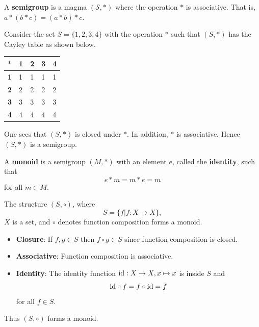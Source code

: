 \begin{definition}
    A \textbf{semigroup} is a magma $(\mathcal{S}, \ast)$ where the operation $\ast$ is associative. That is, $a\ast(b\ast c) = (a\ast b)\ast c$.
\end{definition}
\begin{example}
    Consider the set $S = \{1, 2, 3, 4\}$ with the operation $\ast$ such that $(S, \ast)$ has the Cayley table as shown below.
    \begin{table}[h]
        \centering
        \begin{tabular}{|l|l|l|l|l|}
            \hline
            $\ast$     & \textbf{1} & \textbf{2} & \textbf{3} & \textbf{4} \\ \hline
            \textbf{1} & 1          & 1          & 1          & 1          \\ \hline
            \textbf{2} & 2          & 2          & 2          & 2          \\ \hline
            \textbf{3} & 3          & 3          & 3          & 3          \\ \hline
            \textbf{4} & 4          & 4          & 4          & 4          \\ \hline
        \end{tabular}
    \end{table}
    
    One sees that $(S, \ast)$ is closed under $\ast$. In addition, $\ast$ is associative. Hence $(S, \ast)$ is a semigroup.
\end{example}

\begin{definition}
    A \textbf{monoid} is a semigroup $(M, \ast)$ with an element $e$, called the \textbf{identity}, such that
    \[
        e \ast m = m \ast e = m
    \]
    for all $m \in M$.
\end{definition}
\begin{example}
    The structure $(S, \circ)$, where
    \[
        S = \{f \vert  f: X \to X\},
    \]
    $X$ is a set, and $\circ$ denotes function composition forms a monoid.
    \begin{itemize}
        \item \textbf{Closure}: If $f, g \in S$ then $f\circ g \in S$ since function composition is closed.
        \item \textbf{Associative}: Function composition is associative.
        \item \textbf{Identity}: The identity function $\mathrm{id}: X \to X, x\mapsto x$ is inside $S$ and
        \[
            \mathrm{id} \circ f = f \circ \mathrm{id} = f
        \]
        for all $f \in S$.
    \end{itemize}
    Thus $(S, \circ)$ forms a monoid.
\end{example}

